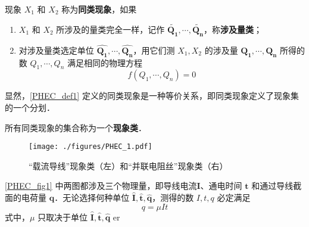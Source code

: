 \begin{definition}{}\label{PHEC_def1}
现象 $X_1$ 和 $X_2$ 称为\textbf{同类现象}，如果
\begin{enumerate}
\item $X_1$ 和 $X_2$ 所涉及的量类完全一样，记作 $\tilde{\boldsymbol{Q_1}},\cdots,\tilde{\boldsymbol{Q_n}}$，称\textbf{涉及量类}； 
\item 对涉及量类选定单位 $\hat{\boldsymbol{Q_1}},\cdots,\hat{\boldsymbol{Q_n}}$，用它们测 $X_1,X_2$ 的涉及量 $\boldsymbol{Q_1},\cdots ,\boldsymbol{Q_n}$ 所得的数 $Q_1,\cdots,Q_n$ 满足相同的物理方程
\begin{equation}
f(Q_1,\cdots,Q_n)=0
\end{equation}
\end{enumerate}
\end{definition}
显然，\autoref{PHEC_def1} 定义的同类现象是一种等价关系，即同类现象定义了现象集的一个分划．
\begin{definition}{}
所有同类现象的集合称为一个\textbf{现象类}．
\end{definition}
\begin{example}{}
\begin{figure}[ht]
\centering
\texttt{[image: ./figures/PHEC\_1.pdf]}
\caption{“载流导线”现象类（左）和“并联电阻丝”现象类（右）} \label{PHEC_fig1}
\end{figure}
\autoref{PHEC_fig1} 中两图都涉及三个物理量，即导线电流$\boldsymbol{I}$、通电时间 $\boldsymbol{t}$ 和通过导线截面的电荷量 $\boldsymbol{q}$．无论选择何种单位 $\hat{\boldsymbol{I}},\hat{\boldsymbol{t}},\hat{\boldsymbol{q}}$，测得的数 $I,t,q$ 必定满足
\begin{equation}
q=\mu It
\end{equation}
式中，$\mu$ 只取决于单位 $\hat{\boldsymbol{I}},\hat{\boldsymbol{t}},\hat{\boldsymbol{q}}$ er
\end{example}